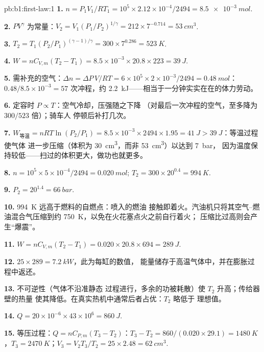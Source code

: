 \begin{solution}{pb:b1:first-law:1}
\textbf{1.} $n = P_1V_1/RT_1 = 10^5 \times 2.12\times10^{-4}/2494 = \qty{8.5e-3}{mol}$.

\textbf{2.} $PV^\gamma$ 为常量：$V_2 = V_1(P_1/P_2)^{1/\gamma} = 212 \times
7^{-0.714} = \qty{53}{cm^3}$.

\textbf{3.} $T_2 = T_1(P_2/P_1)^{(\gamma - 1)/\gamma} = 300 \times 7^{0.286} =
\qty{523}{K}$.

\textbf{4.} $W = nC_{V,m}(T_2 - T_1) = 8.5\times10^{-3} \times 20.8 \times 223 =
\qty{39}{J}$.

\textbf{5.} 需补充的空气：$\Delta n = \Delta P\,V/RT = 6\times10^5 \times 2\times10^{-3}/
2494 = \qty{0.48}{mol}$：$0.48/8.5\times10^{-3} = 57$ 次冲程，约
\qty{2.2}{kJ}——相当于一分钟实实在在的体力劳动。

\textbf{6.} 定容时 $P \propto T$：空气冷却，压强随之下降
（对最后一次冲程的空气，至多降为 $300/523$ 倍）；骑车人
停顿后补打几次。

\textbf{7.} $W_{\text{等温}} = nRT\ln(P_2/P_1) = 8.5\times10^{-3} \times 2494 \times
1.95 = \qty{41}{J} > \qty{39}{J}$：等温过程使气体
进一步压缩（体积为 \qty{30}{cm^3}，而非 \qty{53}{cm^3}）以达到 \qty{7}{bar}，
因为温度保持较低——扫过的体积更大，做功也就更多。

\textbf{8.} $n = 10^5 \times 5\times10^{-4}/2494 = \qty{0.020}{mol}$; $T_2 =
300 \times 20^{0.4} = \qty{994}{K}$.

\textbf{9.} $P_2 = 20^{1.4} = \qty{66}{bar}$.

\textbf{10.} \qty{994}{K} 远高于燃料的自燃点：喷入的燃油
接触即着火。汽油机只将其空气–燃油混合气压缩到约
\qty{750}{K}，以免在火花塞点火之前自行着火；
压缩比过高则会产生“爆震”。

\textbf{11.} $W = nC_{V,m}(T_2 - T_1) = 0.020 \times 20.8 \times 694 = \qty{289}{J}$.

\textbf{12.} $25 \times 289 = \qty{7.2}{kW}$，此为每缸的数值，
能量储存于高温气体中，并在膨胀过程中返还。

\textbf{13.} 不可逆性（气体不沿准静态
过程进行，多余的功被耗散）使 $T_2$ 升高；传给器壁的热量
使其降低。在真实热机中通常后者占优：$T_2$ 略低于
理想值。

\textbf{14.} $Q = 20\times10^{-6} \times 43\times10^6 = \qty{860}{J}$.

\textbf{15.} 等压过程：$Q = nC_{P,m}(T_3 - T_2)$：$T_3 - T_2 = 860/(0.020 \times
29.1) = \qty{1480}{K}$，$T_3 = \qty{2470}{K}$；$V_3 = V_2T_3/T_2 = 25 \times
2.48 = \qty{62}{cm^3}$.


\end{solution}
